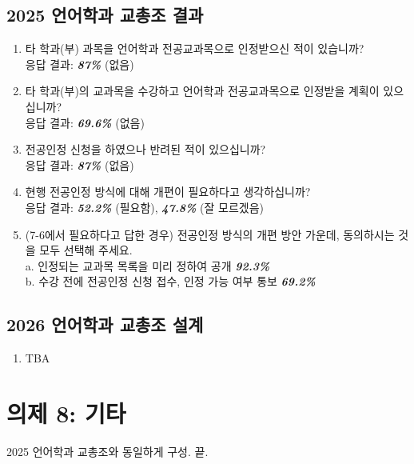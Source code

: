 \documentclass{oblivoir}
\begin{document}
\subsection{2025 언어학과 교총조 결과}
\begin{enumerate}
    \item [7-1] 타 학과(부) 과목을 언어학과 전공교과목으로 인정받으신 적이 있습니까? \\ 응답 결과: \textbf{\textit{87\%}} (없음)
    \item [7-3] 타 학과(부)의 교과목을 수강하고 언어학과 전공교과목으로 인정받을 계획이 있으십니까? \\ 응답 결과: \textbf{\textit{69.6\%}} (없음)
    \item [7-5] 전공인정 신청을 하였으나 반려된 적이 있으십니까? \\ 응답 결과: \textbf{\textit{87\%}} (없음)
    \item [7-6] 현행 전공인정 방식에 대해 개편이 필요하다고 생각하십니까? \\ 응답 결과: \textbf{\textit{52.2\%}} (필요함), \textbf{\textit{47.8\%}} (잘 모르겠음)
    \item [7-7] (7-6에서 필요하다고 답한 경우) 전공인정 방식의 개편 방안 가운데, 동의하시는 것을 모두 선택해 주세요. \\ a. 인정되는 교과목 목록을 미리 정하여 공개 \textbf{\textit{92.3\%}} \\ b. 수강 전에 전공인정 신청 접수, 인정 가능 여부 통보 \textbf{\textit{69.2\%}}
\end{enumerate}

\subsection{2026 언어학과 교총조 설계}
\begin{enumerate}
    \item [7-1] TBA 
\end{enumerate}

\newpage
\section{의제 8: 기타}
2025 언어학과 교총조와 동일하게 구성. 끝.
\end{document}
